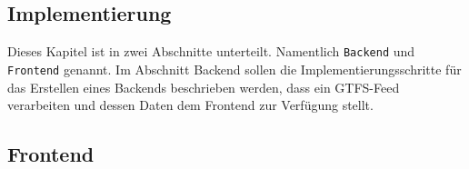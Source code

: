 \begin{newpage}
\section{Implementierung}
\label{sec:implementierung}
  Dieses Kapitel ist in zwei Abschnitte unterteilt. Namentlich \texttt{Backend} und \texttt{Frontend} genannt. Im Abschnitt Backend sollen die Implementierungsschritte für das Erstellen eines Backends beschrieben werden, dass ein GTFS-Feed verarbeiten und dessen Daten dem Frontend zur Verfügung stellt.

    

  \subsection{Frontend}
  \label{sub:frontend}

    

\end{newpage}